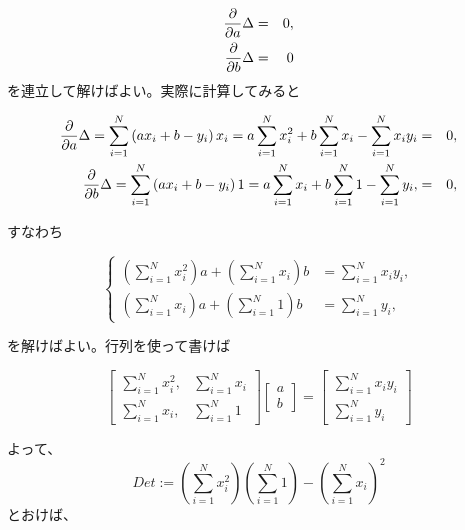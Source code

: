 \documentclass[12pt]{jsarticle}
\def\sumdata{\sum_{i=1}^{N}}
\begin{document}
\begin{eqnarray*}
  \frac{\partial }{\partial a} \Delta &=& 0, \\
  \frac{\partial }{\partial b} \Delta &=& 0
\end{eqnarray*}
を連立して解けばよい。実際に計算してみると

\begin{eqnarray*}
  \partd{}{a} \Delta = \sumdata \left(
  a x_i + b - y_i \right) x_i
  = a \sumdata x_i^2 +b \sumdata x_i - \sumdata x_i y_i
  &=& 0, \\
  \partd{}{b} \Delta = \sumdata \left(
  a x_i + b - y_i \right) 1
  = a \sumdata x_i + b \sumdata 1 - \sumdata y_i, &=& 0,
\end{eqnarray*}

すなわち

\begin{equation}
  \left\{
  \begin{array}{ll}
    \left( \sumdata x_i^2 \right) a + \left( \sumdata x_i \right) b
    &= \sumdata x_i y_i, \\
    \left( \sumdata x_i \right) a + \left( \sumdata 1 \right) b
    &= \sumdata y_i,
  \end{array}
  \right.
\end{equation}

を解けばよい。行列を使って書けば

\begin{equation}
  \begin{bmatrix}
    \sumdata x_i^2, & \sumdata x_i \\
    \sumdata x_i,   & \sumdata 1
  \end{bmatrix}
  \begin{bmatrix}
    a \\
    b
  \end{bmatrix}
  =
  \begin{bmatrix}
    \sumdata x_i y_i \\
    \sumdata y_i
  \end{bmatrix}
\end{equation}

よって、
\begin{equation}
  Det := \left( \sumdata x_i^2 \right) \left( \sumdata 1 \right)
  - \left( \sumdata x_i \right)^2
\end{equation}
とおけば、
\end{document}

